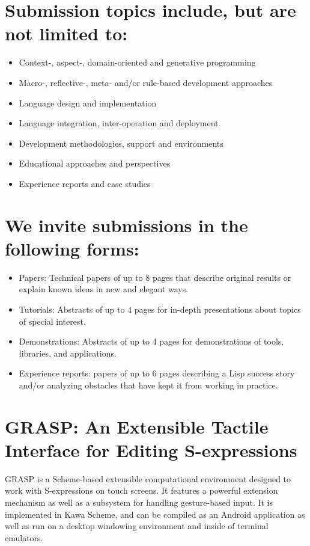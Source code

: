 \documentclass[11pt]{article}
\date{\today}
\title{}
\begin{document}
\tableofcontents

\section{Submission topics include, but are not limited to:}
\label{sec:orgd28cc72}

\begin{itemize}
\item Context-, aspect-, domain-oriented and generative programming
\item Macro-, reflective-, meta- and/or rule-based development approaches
\item Language design and implementation
\item Language integration, inter-operation and deployment
\item Development methodologies, support and environments
\item Educational approaches and perspectives
\item Experience reports and case studies
\end{itemize}

\section{We invite submissions in the following forms:}
\label{sec:org74ce674}

\begin{itemize}
\item Papers: Technical papers of up to 8 pages 
that describe original results or explain 
known ideas in new and elegant ways.
\item Tutorials: Abstracts of up to 4 pages
for in-depth presentations about topics
of special interest.
\item Demonstrations: Abstracts of up to 4 pages
for demonstrations of tools, libraries, and applications.
\item Experience reports: papers of up to 6 pages
describing a Lisp success story and/or analyzing
obstacles that have kept it from working in practice.
\end{itemize}


\section{GRASP: An Extensible Tactile Interface for Editing S-expressions}
\label{sec:org28b6af6}

GRASP is a Scheme-based extensible computational environment
designed to work with S-expressions on touch screens. It features
a powerful extension mechanism as well as a subsystem for
handling gesture-based input. It is implemented in Kawa Scheme,
and can be compiled as an Android application as well as run
on a desktop windowing environment and inside of terminal
emulators.
\end{document}
